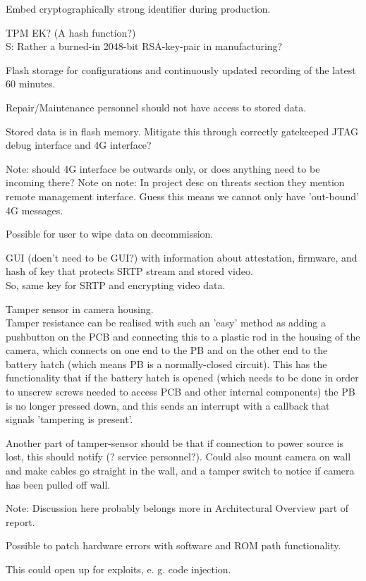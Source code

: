 \documentclass[10pt]{article}
\begin{document}
\begin{checklist}
{      }
      \item{
        Embed cryptographically strong identifier during production.

        TPM EK? (A hash function?) \\
        S: Rather a burned-in 2048-bit RSA-key-pair in manufacturing?
      }
      \item{
          Flash storage for configurations and continuously updated recording
          of the latest 60 minutes.
        } %
      \item{
        Repair/Maintenance personnel should not have access to stored data.

        Stored data is in flash memory. Mitigate this through correctly
        gatekeeped JTAG debug interface and 4G interface?

        Note: should 4G interface be outwards only, or does anything need to be
        incoming there?  Note on note: In project desc on threats section they
        mention remote management interface. Guess this means we cannot only
        have 'out-bound' 4G messages.
      }
      \item{
          Possible for user to wipe data on decommission.
      }
      \item{
          GUI (doen't need to be GUI?) with information about attestation,
          firmware, and hash of key that protects SRTP stream and stored
          video.\\

          So, same key for SRTP and encrypting video data.
      }
      \item{
        Tamper sensor in camera housing. \\

        Tamper resistance can be realised with such an 'easy' method as adding
        a pushbutton on the PCB and connecting this to a plastic rod in the
        housing of the camera, which connects on one end to the PB and on the
        other end to the battery hatch (which means PB is a normally-closed
        circuit). This has the functionality that if the battery hatch is
        opened (which needs to be done in order to unscrew screws needed to
        access PCB and other internal components) the PB is no longer pressed
        down, and this sends an interrupt with a callback that signals
        'tampering is present'.

        Another part of tamper-sensor should be that
        if connection to power source is lost, this should notify (? service
        personnel?).  Could also mount camera on wall and make cables go
        straight in the wall, and a tamper switch to notice if camera has been
        pulled off wall.

        Note: Discussion here probably belongs more in Architectural Overview
        part of report.
      }
      \item{
          Possible to patch hardware errors with software and ROM path
          functionality.

          This could open up for exploits, e. g. code injection.
      }
    \end{checklist}
\end{document}
